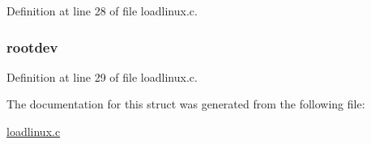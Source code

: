 \-Definition at line 28 of file loadlinux.\-c.

\hypertarget{structatag__core_a79dc316159f961edcc34cc3a22db5260}{
\subsubsection[{rootdev}]{ {\bf rootdev}}}\label{structatag__core_a79dc316159f961edcc34cc3a22db5260}


\-Definition at line 29 of file loadlinux.\-c.



\-The documentation for this struct was generated from the following file\-:\begin{DoxyCompactItemize}
\item 
\hyperlink{loadlinux_8c}{loadlinux.\-c}\end{DoxyCompactItemize}
